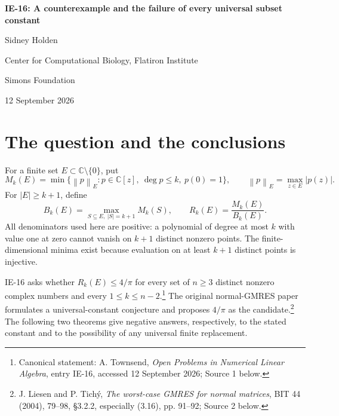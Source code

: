 \documentclass[11pt,a4paper]{article}
\theoremstyle{remark}
\newcommand{\C}{\mathbb C}
\newcommand{\norm}[1]{\left\lVert#1\right\rVert}
\newcommand{\om}{\omega}
\begin{document}
\begin{center}
{\LARGE\bfseries IE-16: A counterexample and the failure of every universal subset constant\par}
\par\vspace{8pt}
{\large Sidney Holden\par}
{\small Center for Computational Biology, Flatiron Institute\par}
{\small Simons Foundation\par}
{\small 12 September 2026\par}
\end{center}
\vspace{5pt}

\begin{abstract}
The proposed $4/\pi$ subset bound is false. Let $\om=e^{2\pi i/3}$ and
$L=\{\om^a+10^{-3}\om^b:0\le a,b\le2\}$. At degree $k=4$, this nine-point
set satisfies
\[
 \frac{M_4(L)}{\max_{S\subset L,\ |S|=5}M_4(S)}>\frac{13}{10}>\frac4\pi.
\]
The proof is analytic and covers every subset by its cluster occupancy.
An additional exact-arithmetic certificate checks all 126 subsets and proves
optimality of the full-set polynomial by positive weighted orthogonality.
The actual ratio is approximately $1.33299891979475829424$.
A three-cluster amplification lemma gives a stronger conclusion: no finite
constant, independent of dimension, degree and the points, can satisfy the
proposed type of bound. For every positive integer $r$ and every $\eta>0$,
examples with $n=3^r$ and $k=(3^r-1)/2$ have ratio greater than
$(2/\sqrt3)^r-\eta$.
\end{abstract}

\section{The question and the conclusions}
For a finite set $E\subset\C\setminus\{0\}$, put
\[
 M_k(E)=\min\{\norm{p}_E:p\in\C[z],\ \deg p\le k,\ p(0)=1\},
 \qquad \norm{p}_E=\max_{z\in E}|p(z)|.
\]
For $|E|\ge k+1$, define
\[
 B_k(E)=\max_{S\subseteq E,\ |S|=k+1}M_k(S),
 \qquad R_k(E)=\frac{M_k(E)}{B_k(E)}.
\]
All denominators used here are positive: a polynomial of degree at most $k$
with value one at zero cannot vanish on $k+1$ distinct nonzero points.
The finite-dimensional minima exist because evaluation on at least $k+1$
distinct points is injective.

IE-16 asks whether $R_k(E)\le4/\pi$ for every set of $n\ge3$ distinct nonzero
complex numbers and every $1\le k\le n-2$.\footnote{Canonical statement:
A. Townsend, \emph{Open Problems in Numerical Linear Algebra}, entry IE-16,
accessed 12 September 2026; Source 1 below.}
The original normal-GMRES paper formulates a universal-constant conjecture
and proposes $4/\pi$ as the candidate.\footnote{J. Liesen and P. Tich\'y,
\emph{The worst-case GMRES for normal matrices}, BIT 44 (2004), 79--98,
\S3.2.2, especially (3.16), pp. 91--92; Source 2 below.}
The following two theorems give negative answers, respectively, to the stated
constant and to the possibility of any universal finite replacement.
\end{document}
